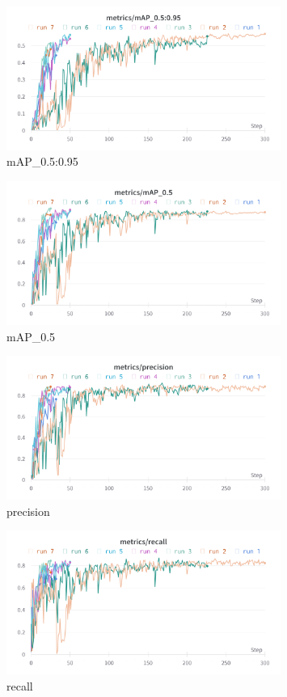 \begin{figure}[h!]
	\centering
	\includegraphics[width=0.8\textwidth]{images/05Testing/map_0.95.png}
	\caption{mAP\_0.5:0.95}
	\label{map_0.95}
\end{figure}

\begin{figure}[h!]
	\centering
	\includegraphics[width=0.8\textwidth]{images/05Testing/map_0.5.png}
	\caption{mAP\_0.5}
	\label{map_0.5}
\end{figure}

\begin{figure}[h!]
	\centering
	\includegraphics[width=0.8\textwidth]{images/05Testing/precision.png}
	\caption{precision}
	\label{precision}
\end{figure}

\begin{figure}[h!]
	\centering
	\includegraphics[width=0.8\textwidth]{images/05Testing/recall.png}
	\caption{recall}
	\label{recall}
\end{figure}

